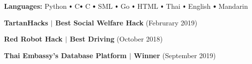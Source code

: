 \documentclass[10pt]{article}
\newcommand\sbullet[1][.5]{\mathbin{\vcenter{\hbox{\scalebox{#1}{$\bullet$}}}}}
\newcommand{\CC}{C\nolinebreak\hspace{-.05em}\raisebox{.4ex}{\tiny\bf +}\nolinebreak\hspace{-.10em}\raisebox{.4ex}{\tiny\bf +}}
\begin{document}
    \textbf{Languages:}
    Python $\sbullet[.75]$ 
    \CC $\sbullet[.75]$ 
    C $\sbullet[.75]$ 
    SML $\sbullet[.75]$ 
    Go $\sbullet[.75]$ 
    HTML $\sbullet[.75]$ 
    Thai $\sbullet[.75]$ 
    English $\sbullet[.75]$ 
    Mandarin

    \vspace{0.1cm}

    \textbf{TartanHacks $\mid$ Best Social Welfare Hack} \hfill (Februrary 2019)

    \textbf{Red Robot Hack $\mid$ Best Driving} \hfill (October 2018)

    \textbf{Thai Embassy's Database Platform $\mid$ Winner} \hfill (September 2019)
\end{document}
